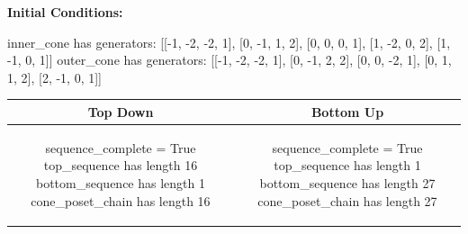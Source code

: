 \documentclass[10pt]{article}
\begin{document}
\textbf{Initial Conditions:}
\begin{SAGE}
inner_cone has generators: 
[[-1, -2, -2, 1], [0, -1, 1, 2], [0, 0, 0, 1], [1, -2, 0, 2], [1, -1, 0, 1]]
outer_cone has generators: 
[[-1, -2, -2, 1], [0, -1, 2, 2], [0, 0, -2, 1], [0, 1, 1, 2], [2, -1, 0, 1]]

\end{SAGE}
\begin{tabular}{c|c}
\textbf{Top Down} & \textbf{Bottom Up} \\ \hline  
\begin{SAGE}
sequence_complete = True
top_sequence has length 16
bottom_sequence has length 1
cone_poset_chain has length 16
\end{SAGE} 
&
\begin{SAGE}
sequence_complete = True
top_sequence has length 1
bottom_sequence has length 27
cone_poset_chain has length 27
\end{SAGE} 
\\ \hline


\end{tabular}
\end{document}
